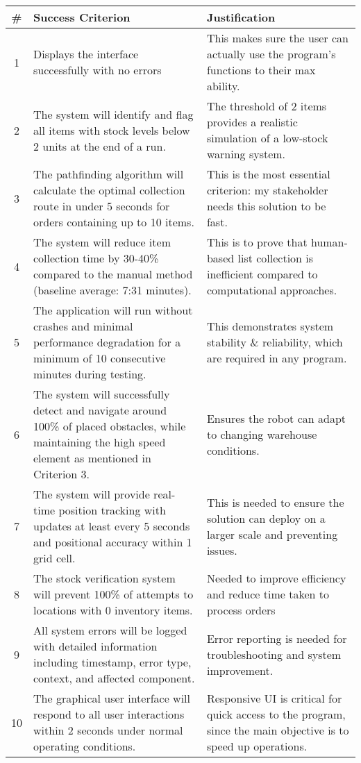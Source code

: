 \begin{table}[htbp!]
	\centering
	\begin{tabularx}{\textwidth}{|c|X|X|}
		\hline
		\textbf{\#} & \textbf{Success Criterion} & \textbf{Justification} \\
		\hline
		1 & Displays the interface successfully with no errors & This makes sure the user can actually use the program's functions to their max ability. \\
		\hline
		2 & The system will identify and flag all items with stock levels below 2 units at the end of a run. & The threshold of 2 items provides a realistic simulation of a low-stock warning system. \\
		\hline
		3 & The pathfinding algorithm will calculate the optimal collection route in under 5 seconds for orders containing up to 10 items. & This is the most essential criterion: my stakeholder needs this solution to be fast. \\
		\hline
		4 & The system will reduce item collection time by 30-40\% compared to the manual method (baseline average: 7:31 minutes). & This is to prove that human-based list collection is inefficient compared to computational approaches. \\
		\hline
		5 & The application will run without crashes and minimal performance degradation for a minimum of 10 consecutive minutes during testing. & This demonstrates system stability \& reliability, which are required in any program. \\
		\hline
		6 & The system will successfully detect and navigate around 100\% of placed obstacles, while maintaining the high speed element as mentioned in Criterion 3. & Ensures the robot can adapt to changing warehouse conditions. \\
		\hline
		7 & The system will provide real-time position tracking with updates at least every 5 seconds and positional accuracy within 1 grid cell. & This is needed to ensure the solution can deploy on a larger scale and preventing issues. \\
		\hline
		8 & The stock verification system will prevent 100\% of attempts to locations with 0 inventory items. & Needed to improve efficiency and reduce time taken to process orders \\
		\hline
		9 & All system errors will be logged with detailed information including timestamp, error type, context, and affected component. & Error reporting is needed for troubleshooting and system improvement. \\
		\hline
		10 & The graphical user interface will respond to all user interactions within 2 seconds under normal operating conditions. & Responsive UI is critical for quick access to the program, since the main objective is to speed up operations. \\

\end{tabularx}
\end{table}
